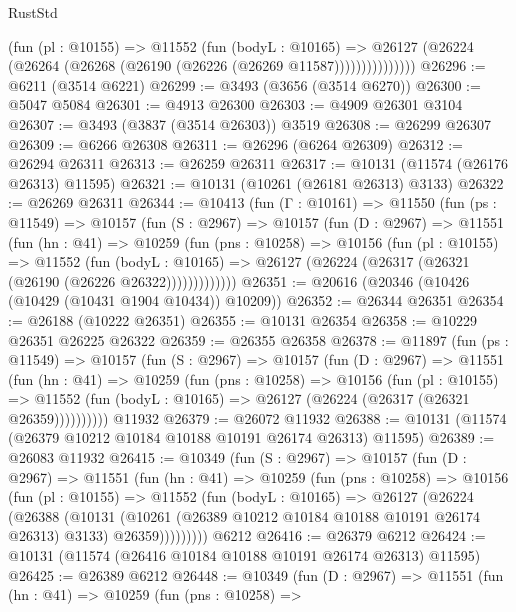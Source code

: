 \begin{lexlean}{RustStd}
\begin{coremodule}
                  (fun (pl : @10155) =>
                  @11552
                    (fun (bodyL : @10165) =>
                    @26127 (@26224 (@26264 (@26268 (@26190 (@26226 (@26269 @11587)))))))))))))))
@26296 := @6211 (@3514 @6221)
@26299 := @3493 (@3656 (@3514 @6270))
@26300 := @5047 @5084
@26301 := @4913 @26300
@26303 := @4909 @26301 @3104
@26307 := @3493 (@3837 (@3514 @26303)) @3519
@26308 := @26299 @26307
@26309 := @6266 @26308
@26311 := @26296 (@6264 @26309)
@26312 := @26294 @26311
@26313 := @26259 @26311
@26317 := @10131 (@11574 (@26176 @26313) @11595)
@26321 := @10131 (@10261 (@26181 @26313) @3133)
@26322 := @26269 @26311
@26344 := @10413
    (fun (Γ : @10161) =>
    @11550
      (fun (ps : @11549) =>
      @10157
        (fun (S : @2967) =>
        @10157
          (fun (D : @2967) =>
          @11551
            (fun (hn : @41) =>
            @10259
              (fun (pns : @10258) =>
              @10156
                (fun (pl : @10155) =>
                @11552
                  (fun (bodyL : @10165) =>
                  @26127 (@26224 (@26317 (@26321 (@26190 (@26226 @26322)))))))))))))
@26351 := @20616 (@20346 (@10426 (@10429 (@10431 @1904 @10434)) @10209))
@26352 := @26344 @26351
@26354 := @26188 (@10222 @26351)
@26355 := @10131 @26354
@26358 := @10229 @26351 @26225 @26322
@26359 := @26355 @26358
@26378 := @11897
    (fun (ps : @11549) =>
    @10157
      (fun (S : @2967) =>
      @10157
        (fun (D : @2967) =>
        @11551
          (fun (hn : @41) =>
          @10259
            (fun (pns : @10258) =>
            @10156
              (fun (pl : @10155) =>
              @11552 (fun (bodyL : @10165) => @26127 (@26224 (@26317 (@26321 @26359))))))))))
    @11932
@26379 := @26072 @11932
@26388 := @10131 (@11574 (@26379 @10212 @10184 @10188 @10191 @26174 @26313) @11595)
@26389 := @26083 @11932
@26415 := @10349
    (fun (S : @2967) =>
    @10157
      (fun (D : @2967) =>
      @11551
        (fun (hn : @41) =>
        @10259
          (fun (pns : @10258) =>
          @10156
            (fun (pl : @10155) =>
            @11552
              (fun (bodyL : @10165) =>
              @26127
                (@26224
                  (@26388
                    (@10131
                      (@10261 (@26389 @10212 @10184 @10188 @10191 @26174 @26313) @3133)
                      @26359)))))))))
    @6212
@26416 := @26379 @6212
@26424 := @10131 (@11574 (@26416 @10184 @10188 @10191 @26174 @26313) @11595)
@26425 := @26389 @6212
@26448 := @10349
    (fun (D : @2967) =>
    @11551
      (fun (hn : @41) =>
      @10259
        (fun (pns : @10258) =>

\end{coremodule}
\end{lexlean}
